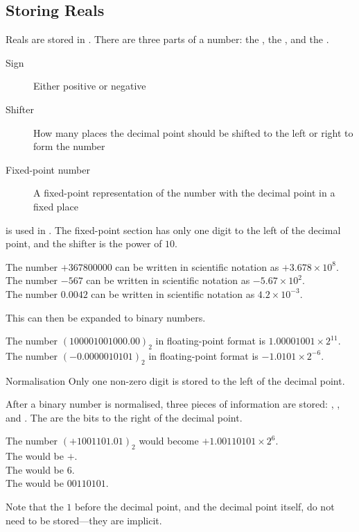 \documentclass[\main/notes.tex]{subfiles}
\begin{document}
			\subsection{Storing Reals}
				Reals are stored in . There are three parts of a  number: the , the , and the .
				\begin{indentparagraph}
					\begin{description}
						\item[Sign] Either positive or negative
						\item[Shifter] How many places the decimal point should be shifted to the left or right to form the number
						\item[Fixed-point number] A fixed-point representation of the number with the decimal point in a fixed place
					\end{description}
				\end{indentparagraph}
				 is used in . The fixed-point section has only one digit to the left of the decimal point, and the shifter is the power of $10$.
				\begin{example}
					The number $+367800000$ can be written in scientific notation as $+3.678 \times 10^{8}$.\\
					The number $-567$ can be written in scientific notation as $-5.67 \times 10^{2}$.\\
					The number $0.0042$ can be written in scientific notation as $4.2 \times 10^{-3}$. 
				\end{example}
				This can then be expanded to binary numbers.
				\begin{example}
					The number $(100001001000.00)_{2}$ in floating-point format is $1.00001001 \times 2^{11}$.\\
					The number $(-0.0000010101)_{2}$ in floating-point format is $-1.0101 \times 2^{-6}$.
				\end{example}
				\begin{definition}{Normalisation}
					Only one non-zero digit is stored to the left of the decimal point.
				\end{definition}
				\pagebreak
				After a binary number is normalised, three pieces of information are stored: , , and . The  are the bits to the right of the decimal point.
				\begin{example}
					The number $(+1001101.01)_{2}$ would become $+ 1.00110101 \times 2^{6}$.\\
					The  would be $+$.\\
					The  would be $6$.\\
					The  would be $00110101$.
					\begin{indentparagraph}
						Note that the $1$ before the decimal point, and the decimal point itself, do not need to be stored---they are implicit.
					\end{indentparagraph}
				\end{example}
\end{document}
